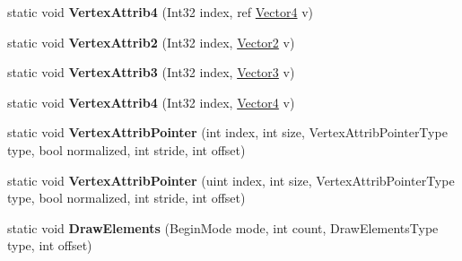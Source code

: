 \begin{DoxyCompactItemize}
\item 
\hypertarget{class_open_t_k_1_1_graphics_1_1_e_s20_1_1_g_l_afd1456bf9680429460627d7782c36148}{static void {\bfseries Vertex\-Attrib4} (Int32 index, ref \hyperlink{struct_open_t_k_1_1_vector4}{Vector4} v)}\label{class_open_t_k_1_1_graphics_1_1_e_s20_1_1_g_l_afd1456bf9680429460627d7782c36148}

\item 
\hypertarget{class_open_t_k_1_1_graphics_1_1_e_s20_1_1_g_l_a311c5db0d3271e7a9a9ec1a141b36202}{static void {\bfseries Vertex\-Attrib2} (Int32 index, \hyperlink{struct_open_t_k_1_1_vector2}{Vector2} v)}\label{class_open_t_k_1_1_graphics_1_1_e_s20_1_1_g_l_a311c5db0d3271e7a9a9ec1a141b36202}

\item 
\hypertarget{class_open_t_k_1_1_graphics_1_1_e_s20_1_1_g_l_a2a18d9c66c7788848cb404493165f673}{static void {\bfseries Vertex\-Attrib3} (Int32 index, \hyperlink{struct_open_t_k_1_1_vector3}{Vector3} v)}\label{class_open_t_k_1_1_graphics_1_1_e_s20_1_1_g_l_a2a18d9c66c7788848cb404493165f673}

\item 
\hypertarget{class_open_t_k_1_1_graphics_1_1_e_s20_1_1_g_l_a2f6066eb3b374cfcc89e4bd0f0c780cc}{static void {\bfseries Vertex\-Attrib4} (Int32 index, \hyperlink{struct_open_t_k_1_1_vector4}{Vector4} v)}\label{class_open_t_k_1_1_graphics_1_1_e_s20_1_1_g_l_a2f6066eb3b374cfcc89e4bd0f0c780cc}

\item 
\hypertarget{class_open_t_k_1_1_graphics_1_1_e_s20_1_1_g_l_a1253b909cb85f1f48635e7ec438c1649}{static void {\bfseries Vertex\-Attrib\-Pointer} (int index, int size, Vertex\-Attrib\-Pointer\-Type type, bool normalized, int stride, int offset)}\label{class_open_t_k_1_1_graphics_1_1_e_s20_1_1_g_l_a1253b909cb85f1f48635e7ec438c1649}

\item 
\hypertarget{class_open_t_k_1_1_graphics_1_1_e_s20_1_1_g_l_a9120e8aeb4effb48824ea32d7f9b5080}{static void {\bfseries Vertex\-Attrib\-Pointer} (uint index, int size, Vertex\-Attrib\-Pointer\-Type type, bool normalized, int stride, int offset)}\label{class_open_t_k_1_1_graphics_1_1_e_s20_1_1_g_l_a9120e8aeb4effb48824ea32d7f9b5080}

\item 
\hypertarget{class_open_t_k_1_1_graphics_1_1_e_s20_1_1_g_l_acc41a85343fd19a4d637bea891d4a543}{static void {\bfseries Draw\-Elements} (Begin\-Mode mode, int count, Draw\-Elements\-Type type, int offset)}\label{class_open_t_k_1_1_graphics_1_1_e_s20_1_1_g_l_acc41a85343fd19a4d637bea891d4a543}


\end{DoxyCompactItemize}
